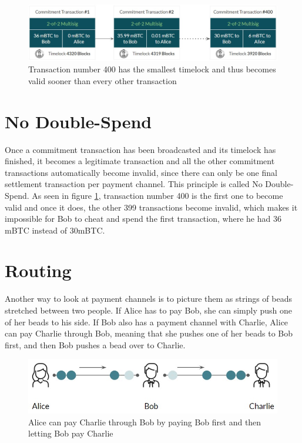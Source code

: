 \documentclass[a4paper, 12pt]{report}
\begin{document}
\begin{figure}[h]
	\centering
	\includegraphics[width=13cm]{06_Timelocks}
	\caption{Transaction number 400 has the smallest timelock and thus becomes valid sooner than every other transaction}
	\label{fig:06_Timelocks}
\end{figure}

\section{No Double-Spend}
\par Once a commitment transaction has been broadcasted and its timelock has finished, it becomes a legitimate transaction and all the other commitment transactions automatically become invalid, since there can only be one final settlement transaction per payment channel. This principle is called No Double-Spend.  As seen in figure \ref{fig:06_Timelocks}, transaction number 400 is the first one to become valid and once it does, the other 399 transactions become invalid, which makes it impossible for Bob to cheat and spend the first transaction, where he had 36 mBTC instead of 30mBTC.

\section{Routing}
\par Another way to look at payment channels is to picture them as strings of beads stretched between two people. If Alice has to pay Bob, she can simply push one of her beads to his side. If Bob also has a payment channel with Charlie, Alice can pay Charlie through Bob, meaning that she pushes one of her beads to Bob first, and then Bob pushes a bead over to Charlie.

\begin{figure}[h]
	\centering
	\includegraphics[width=12cm]{07_Beads}
	\caption{Alice can pay Charlie through Bob by paying Bob first and then letting Bob pay Charlie}
	\label{fig:07_Beads}
\end{figure}
\end{document}
